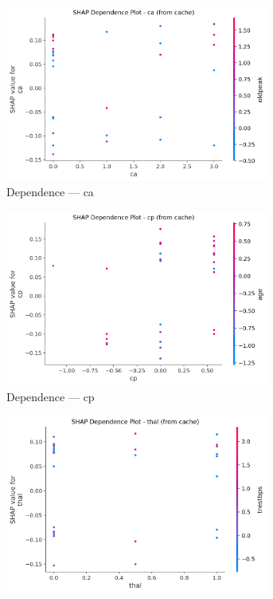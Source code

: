 \begin{figure}[H]
\centering
\begin{subfigure}[b]{0.31\textwidth}
\centering
\includegraphics[width=0.95\textwidth]{Result/cleveland_dataset/RF/SHAP/Dependence CA.png}
\caption{Dependence — ca}
\label{fig:rf_clev_dep_ca}
\end{subfigure}\hfill
\begin{subfigure}[b]{0.31\textwidth}
\centering
\includegraphics[width=0.95\textwidth]{Result/cleveland_dataset/RF/SHAP/Dependence CP.png}
\caption{Dependence — cp}
\label{fig:rf_clev_dep_cp}
\end{subfigure}\hfill
\begin{subfigure}[b]{0.31\textwidth}
\centering
\includegraphics[width=0.95\textwidth]{Result/cleveland_dataset/RF/SHAP/Dependence thal.png}

\end{subfigure}
\end{figure}
